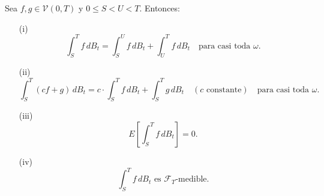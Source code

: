 \begin{theorem}[3.2.1]
Sea $ f, g \in \mathcal{V}(0, T) $ y  $ 0 \leq S < U < T $. Entonces:

\begin{enumerate}
    \item[(i)] \[ 
        \int_{S}^{T} f \, dB_t = \int_{S}^{U} f \, dB_t + \int_{U}^{T} f \, dB_t \quad \text{para casi toda } \omega.
    \]
    
    \item[(ii)] \[
        \int_{S}^{T} (c f + g) \, dB_t = c \cdot \int_{S}^{T} f \, dB_t + \int_{S}^{T} g \, dB_t \quad (c \text{ constante}) \quad \text{para casi toda } \omega.
    \]
    
    \item[(iii)] \[
        E \left[ \int_{S}^{T} f \, dB_t \right] = 0.
    \]
    
    \item[(iv)] \[
        \int_{S}^{T} f \, dB_t \text{ es } \mathcal{F}_T\text{-medible}.
    \]
\end{enumerate}
\end{theorem}


